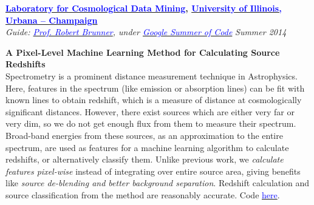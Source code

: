 \documentclass[margin,line]{res}
\newenvironment{list1}{
  \begin{list}{\ding{113}}{%
      \setlength{\itemsep}{0in}
      \setlength{\parsep}{0in} \setlength{\parskip}{0in}
      \setlength{\topsep}{0in} \setlength{\partopsep}{0in} 
      \setlength{\leftmargin}{0.17in}}}{\end{list}}
\begin{document}
\begin{resume}
{\bf \href{http://lcdm.astro.illinois.edu/}{\textcolor{blue} {Laboratory for Cosmological Data Mining}}, \href{http://www.illinois.edu/}{\textcolor{blue}{University of Illinois, Urbana -- Champaign}}} \\
{\em Guide: \href{http://www.astro.illinois.edu/people/bigdog}{\textcolor{blue}{Prof. Robert Brunner}}, under \href{https://www.google-melange.com/gsoc/homepage/google/gsoc2014}{\textcolor{blue} {Google Summer of Code}}} \hfill {\it Summer 2014} \\
\vspace*{-.13in}
\begin{list1}
\item[]\textbf{A Pixel-Level Machine Learning Method for Calculating Source Redshifts} \\
Spectrometry is a prominent distance measurement technique in Astrophysics. Here, features in the spectrum (like emission or absorption lines) can be fit with known lines to obtain redshift, which is a measure of distance at cosmologically significant distances. However, there exist sources which are either very far or very dim, so we do not get enough flux from them to measure their spectrum. Broad-band energies from these sources, as an approximation to the entire spectrum, are used as features for a machine learning algorithm to calculate redshifts, or alternatively classify them. Unlike previous work, we \textit{calculate features pixel-wise} instead of integrating over entire source area, giving benefits like \textit{source de-blending and better background separation}. Redshift calculation and source classification from the method are reasonably accurate. Code \href{https://github.com/alankarkotwal/image-photo-z/}{\textcolor{blue} {here}}.
\end{list1}


\end{resume}
\end{document}
